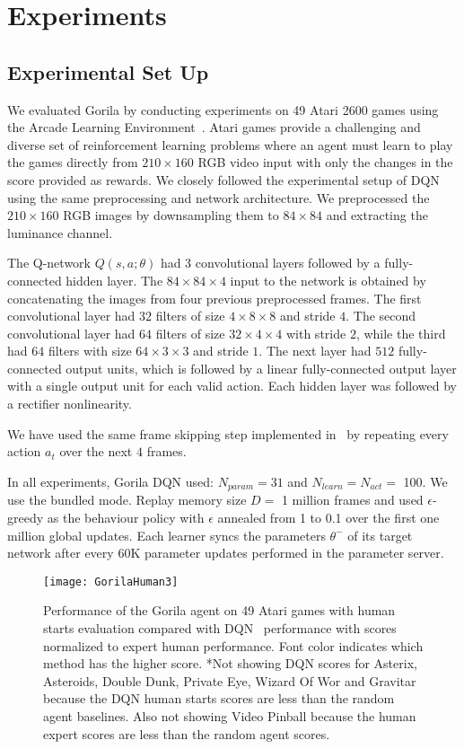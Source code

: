 \section{Experiments}
\subsection{Experimental Set Up}
We evaluated Gorila by conducting experiments on 49 Atari 2600 games using the Arcade Learning Environment~\cite{bellemare-ale}.
Atari games provide a challenging and diverse set of reinforcement learning problems where an agent must learn to play the games directly from $210\times 160$ RGB video input with only the changes in the score provided as rewards.
We closely followed the experimental setup of DQN~\cite{mnih-dqn-2015} using the same preprocessing and network architecture.
We preprocessed the $210\times 160$ RGB images by downsampling them to $84\times 84$ and extracting the luminance channel.

The Q-network $Q(s,a;\theta)$ had 3 convolutional layers followed by a fully-connected hidden layer.
The $84\times 84\times 4$ input to the network is obtained by concatenating the images from four previous preprocessed frames.
The first convolutional layer had $32$ filters of size $4\times 8\times 8$ and stride $4$. The second convolutional layer had $64$ filters of size $32\times 4\times 4$ with stride $2$, while the third had $64$ filters with size $64\times 3\times 3$ and stride $1$. The next layer had $512$ fully-connected output units, which is followed by a linear fully-connected output layer with a single output unit for each valid action. 
Each hidden layer was followed by a rectifier nonlinearity.

We have used the same frame skipping step implemented in~\cite{mnih-dqn-2015} by repeating every action $a_t$ over the next $4$ frames. 

In all experiments, Gorila DQN used: $N_{param}=31$ and $N_{learn} = N_{act} =$ 100. We use the bundled mode. Replay memory size $D=$ 1 million frames and used $\epsilon$-greedy as the behaviour policy with $\epsilon$ annealed from 1 to 0.1 over the first one million global updates.
Each learner syncs the parameters $\theta^-$ of its target network after every 60K parameter updates performed in the parameter server.


\begin{figure*}[!ht]
	\vskip -0.1in
	\begin{center}
		\centerline{\texttt{[image: GorilaHuman3]}}
		\caption{Performance of the Gorila agent on 49 Atari games with human starts evaluation compared with DQN~\cite{mnih-dqn-2015} performance with scores normalized to expert human performance.  Font color indicates which method has the higher score. *Not showing DQN scores for Asterix, Asteroids, Double Dunk, Private Eye, Wizard Of Wor and Gravitar because the DQN human starts scores are less than the random agent baselines. Also not showing Video Pinball because the human expert scores are less than the random agent scores.}
		\label{fig:humanstarts}
	\end{center}
	\vskip -0.2in
\end{figure*}

